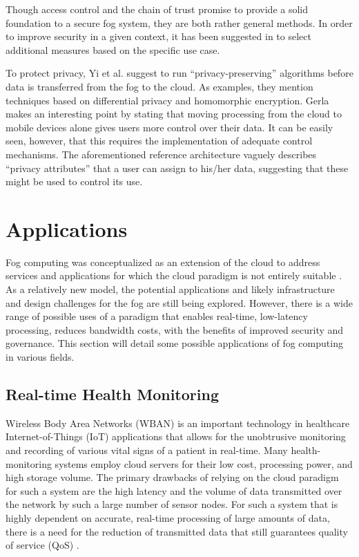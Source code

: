 \documentclass{article}
\begin{document}
Though access control and the chain of trust promise to provide a solid foundation to a secure fog system, they are both rather general methods. In order to improve security in a given context, it has been suggested in \cite{openfogconsortium2017} to select additional measures based on the specific use case.

To protect privacy, Yi et al. \cite{yi2015survey} suggest to run ``privacy-preserving'' algorithms before data is transferred from the fog to the cloud. As examples, they mention techniques based on differential privacy and homomorphic encryption. Gerla \cite{gerla2012vehicular} makes an interesting point by stating that moving processing from the cloud to mobile devices alone gives users more control over their data. It can be easily seen, however, that this requires the implementation of adequate control mechanisms. The aforementioned reference architecture \cite{openfogconsortium2017} vaguely describes ``privacy attributes'' that a user can assign to his/her data, suggesting that these might be used to control its use.

\pagebreak

\section{Applications}

Fog computing was conceptualized as an extension of the cloud to address services and applications for which the cloud paradigm is not entirely suitable \cite{bessis2014big}. As a relatively new model, the potential applications and likely infrastructure and design challenges for the fog are still being explored. However, there is a wide range of possible uses of a paradigm that enables real-time, low-latency processing, reduces bandwidth costs, with the benefits of improved security and governance. This section will detail some possible applications of fog computing in various fields.

\subsection{Real-time Health Monitoring}
Wireless Body Area Networks (WBAN) is an important technology in healthcare Internet-of-Things (IoT) applications that allows for the unobtrusive monitoring and recording of various vital signs of a patient in real-time. Many health-monitoring systems employ cloud servers for their low cost, processing power, and high storage volume. The primary drawbacks of relying on the cloud paradigm for such a system are the high latency and the volume of data transmitted over the network by such a large number of sensor nodes. For such a system that is highly dependent on accurate, real-time processing of large amounts of data, there is a need for the reduction of transmitted data that still guarantees quality of service (QoS) \cite{gia2015fog}.
\end{document}

